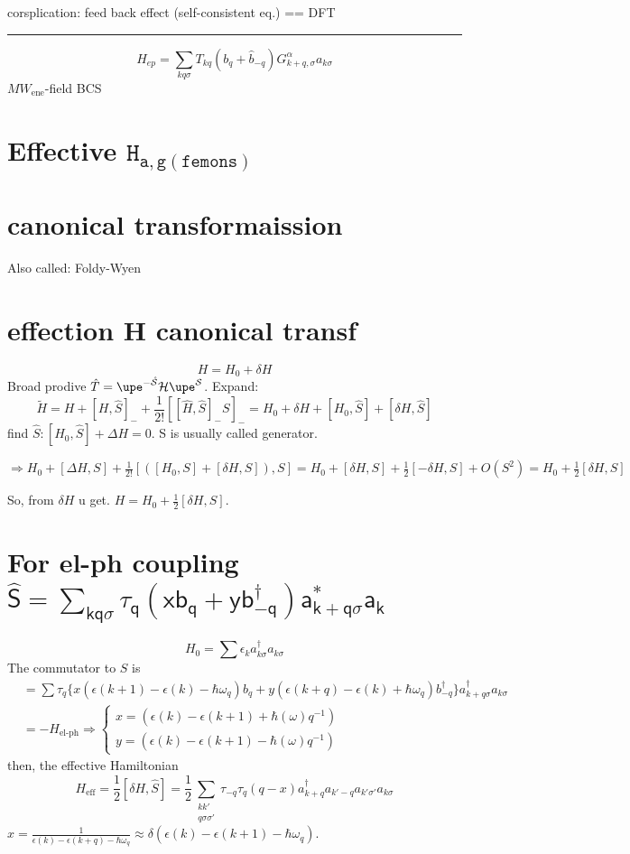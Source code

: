 corsplication: feed back effect (self-consistent eq.) == DFT


\hrule

\[
  H_{ep} = \sum_{kq\sigma}T_{kq} (b_q + \hat b_{-q})G_{k+q,\sigma}^\alpha a_{k\sigma}
\]
$MW_\text{ene}$-field BCS

\section{Effective $\mathtt{H_{a,g(\text{femons})}}$}


\section{canonical transformaission}

Also called: Foldy-Wyen

\section{effection H canonical transf}

\[H = H_0 + \delta H\]
Broad prodive $\hat T = \upe^{-\hat{\mathcal S}} \mathcal H \upe^{\mathcal S}$.
Expand: \[
\tilde H = H + [H,\hat S]_- + \frac1{2!} [[\hat H,\hat S]_-S]_-
= H_0 + \delta H + [H_0,\hat S] + [\delta H, \hat S]
\]
find $\hat S: [H_0,\hat S] + \Delta H = 0$. S is usually called generator.

$\Rightarrow H_0 + [\Delta H, S] + \frac1{2!}[([H_0,S] + [\delta H,S]),S]
= H_0 + [\delta H, S] + \frac12 [-\delta H,S] + O(S^2) = H_0 + \frac12[\delta H,S]$

So, from $\delta H$ u get. $H = H_0 + \frac12[\delta H,S]$.

\section{For el-ph coupling $\mathsf{\hat S
  = \sum _{kq\sigma} \tau_q (x b_q + y b_{-q}^\dagger) a_{k+ q\sigma}^* a_k}$}
\[
  H_0 = \sum \epsilon_k a_{k\sigma}^\dagger a_{k\sigma}
\]
The commutator to $S$ is
\begin{align*}
  [H_0, \hat S] & = \sum \tau_q \{x(\epsilon(k+1) - \epsilon(k) - \hbar \omega_q)b_q + y(\epsilon(k+q) - \epsilon(k) + \hbar\omega_q) b_{-q}^\dagger\} a_{k+q\sigma}^\dagger a_{k\sigma}\\
& = -H_\text{el-ph} \Rightarrow
  \begin{cases}
    x = (\epsilon(k) - \epsilon(k+1) + \hbar (\omega)q^{-1})\\
    y = (\epsilon(k) - \epsilon(k+1) - \hbar (\omega)q^{-1})
  \end{cases}
\end{align*}
then, the effective Hamiltonian
\[
  H_\text{eff} = \frac12 [\delta H,\hat S]
= \frac12 \sum_{\substack{kk'\\q\sigma\sigma'}}
  \tau_{-q} \tau_q (q-x) a_{k+q}^\dagger a_{k'-q} a_{k'\sigma'} a_{k\sigma}
\]
$x = \frac{1}{\epsilon(k) - \epsilon(k+q) - \hbar\omega_q} \approx \delta(\epsilon(k) - \epsilon(k+1) - \hbar\omega_q)$.

